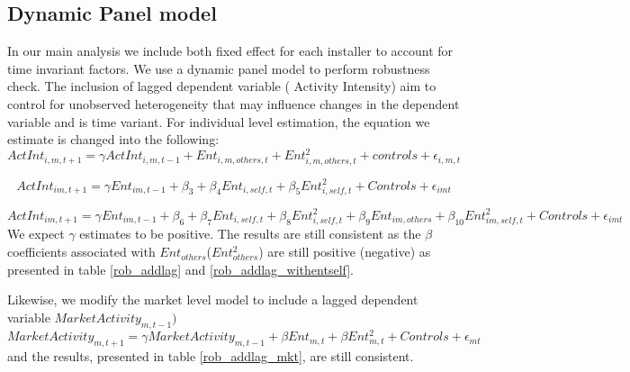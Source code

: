 \documentclass[msom,blindrev]{informs3}
\begin{document}
\subsection{Dynamic Panel model}
In our main analysis we include both fixed effect for each installer to account for time invariant factors. We use a dynamic panel model to perform robustness check. The inclusion of lagged dependent variable ( Activity Intensity) aim to control for unobserved heterogeneity that may influence changes in the dependent variable and is time variant. For individual level estimation, the equation we estimate is changed into the following:
\begin{equation}
    ActInt_{i,m,t+1}=\gamma ActInt_{i,m,t-1}+Ent_{i,m,others,t}+Ent_{i,m,others,t}^2+
    controls+\epsilon_{i,m,t}
\end{equation}

\begin{equation}
    ActInt_{im,t+1}=\gamma Ent_{im,t-1}+\beta_{3}+\beta_{4} Ent_{i,self,t}+\beta_{5}Ent_{i,self,t}^2+
   Controls+\epsilon_{imt}
   \label{model_ind_dyn_1}
\end{equation}

\begin{equation}
    ActInt_{im,t+1}=\gamma Ent_{im,t-1}+\beta_{6}+\beta_{7} Ent_{i,self,t}+\beta_{8}Ent_{i,self,t}^2+\beta_{9}Ent_{im,others}+\beta_{10}Ent_{im,self,t}^2+
   Controls+\epsilon_{imt}
   \label{model_ind_dyn_2}
\end{equation}
We expect $\gamma$ estimates to be positive. The results are still consistent as the $\beta$ coefficients associated with $Ent_{others}$($Ent_{others}^2$) are still positive (negative) as presented in table \ref{rob_addlag} and \ref{rob_addlag_withentself}.

Likewise, we modify the market level model to include a lagged dependent variable $MarketActivity_{m,t-1})$
\begin{equation}
    MarketActivity_{m,t+1}=\gamma MarketActivity_{m,t-1}+\beta Ent_{m,t}+\beta Ent_{m,t}^2+Controls+\epsilon_{mt}
\end{equation}
and the results, presented in table \ref{rob_addlag_mkt}, are still consistent.



\end{document}
